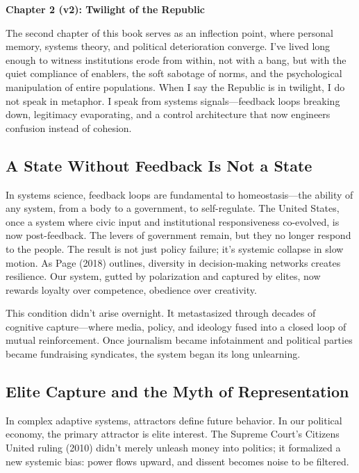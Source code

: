 \textbf{Chapter 2 (v2): Twilight of the Republic}

The second chapter of this book serves as an inflection point, where
personal memory, systems theory, and political deterioration converge.
I've lived long enough to witness institutions erode from within, not
with a bang, but with the quiet compliance of enablers, the soft
sabotage of norms, and the psychological manipulation of entire
populations. When I say the Republic is in twilight, I do not speak in
metaphor. I speak from systems signals---feedback loops breaking down,
legitimacy evaporating, and a control architecture that now engineers
confusion instead of cohesion.

\subsection{A State Without Feedback Is Not a
State}\label{a-state-without-feedback-is-not-a-state}

In systems science, feedback loops are fundamental to homeostasis---the
ability of any system, from a body to a government, to self-regulate.
The United States, once a system where civic input and institutional
responsiveness co-evolved, is now post-feedback. The levers of
government remain, but they no longer respond to the people. The result
is not just policy failure; it's systemic collapse in slow motion. As
Page (2018) outlines, diversity in decision-making networks creates
resilience. Our system, gutted by polarization and captured by elites,
now rewards loyalty over competence, obedience over creativity.

This condition didn't arise overnight. It metastasized through decades
of cognitive capture---where media, policy, and ideology fused into a
closed loop of mutual reinforcement. Once journalism became infotainment
and political parties became fundraising syndicates, the system began
its long unlearning.

\subsection{Elite Capture and the Myth of
Representation}\label{elite-capture-and-the-myth-of-representation}

In complex adaptive systems, attractors define future behavior. In our
political economy, the primary attractor is elite interest. The Supreme
Court's Citizens United ruling (2010) didn't merely unleash money into
politics; it formalized a new systemic bias: power flows upward, and
dissent becomes noise to be filtered.

